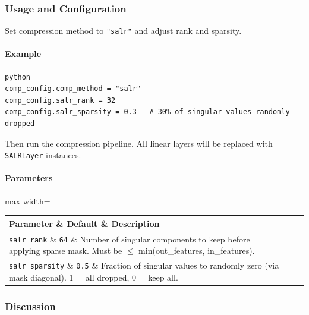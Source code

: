 \subsubsection*{Usage and Configuration}

Set compression method to \texttt{"salr"} and adjust rank and sparsity.

\paragraph{Example}

\vspace{0.5em}
\begin{mdframed}[backgroundcolor=codebg, linecolor=codeframe, linewidth=1pt, roundcorner=4pt, innerleftmargin=2pt, innerrightmargin=5pt, innertopmargin=5pt, innerbottommargin=5pt]
\begin{lstlisting}
python
comp_config.comp_method = "salr"
comp_config.salr_rank = 32
comp_config.salr_sparsity = 0.3   # 30% of singular values randomly dropped
\end{lstlisting}
\end{mdframed}
\vspace{0.5em}

Then run the compression pipeline. All linear layers will be replaced with \texttt{SALRLayer} instances.

\paragraph{Parameters}

\begin{center}
\begin{adjustbox}{max width=\columnwidth}
\renewcommand{\arraystretch}{1.2}
\begin{tabular}{lll}
\toprule
Parameter \& Default \& Description \\
\midrule
\texttt{salr\_rank} \& \texttt{64} \& Number of singular components to keep before applying sparse mask. Must be $\le$ min(out\_features, in\_features). \\
\texttt{salr\_sparsity} \& \texttt{0.5} \& Fraction of singular values to randomly zero (via mask diagonal). 1 = all dropped, 0 = keep all. \\

\bottomrule
\end{tabular}
\end{adjustbox}
\end{center}

\subsubsection*{Discussion}

